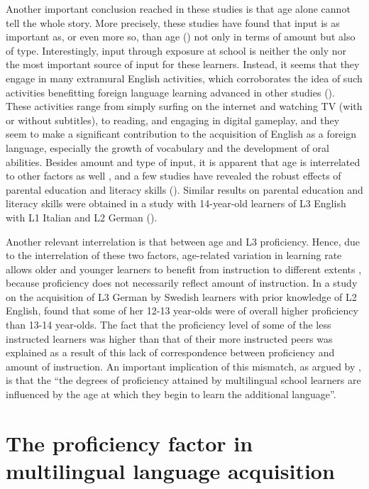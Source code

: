 \documentclass[output=paper,colorlinks,citecolor=brown,nonflat]{langsci/langscibook}
\begin{document}
Another important conclusion reached in these studies is that age alone cannot tell the whole story. More precisely, these studies have found that input is as important as, or even more so, than age (\citealt{Muñoz2006, Muñoz2014, Muñoz2019, PfenningerSingleton2017}) not only in terms of amount but also of type. Interestingly, input through exposure at school is neither the only nor the most important source of input for these learners. Instead, it seems that they engage in many extramural English activities, which corroborates the idea of such activities benefitting foreign language learning advanced in other studies (\citealt{SundqvistSylvén2014}). These activities range from simply surfing on the internet and watching TV (with or without subtitles), to reading, and engaging in digital gameplay, and they seem to make a significant contribution to the acquisition of English as a foreign language, especially the growth of vocabulary and the development of oral abilities. Besides amount and type of input, it is apparent that age is interrelated to other factors as well \citep{Muñoz2014}, and a few studies have revealed the robust effects of parental education and literacy skills (\citealt{PfenningerSingleton2017, Muñoz2019, MuñozSingleton2019}). Similar results on parental education and literacy skills were obtained in a study with 14-year-old learners of L3 English with L1 Italian and L2 German (\citealt{DeAngelis2015}).

Another relevant interrelation is that between age and L3 proficiency. Hence, due to the interrelation of these two factors, age-related variation in learning rate allows older and younger learners to benefit from instruction to different extents \citep{Muñoz2006}, because proficiency does not necessarily reflect amount of instruction. In a study on the acquisition of L3 German by Swedish learners with prior knowledge of L2 English, \citet{Sayehli2001} found that some of her 12-13 year-olds were of overall higher proficiency than 13-14 year-olds. The fact that the proficiency level of some of the less instructed learners was higher than that of their more instructed peers was explained as a result of this lack of correspondence between proficiency and amount of instruction. An important implication of this mismatch, as argued by \citet[214]{MuñozSingleton2019}, is that the “the degrees of proficiency attained by multilingual school learners are influenced by the age at which they begin to learn the additional language”.

\section{The proficiency factor in multilingual language acquisition}\label{sec:sanchez1:3}
\end{document}
